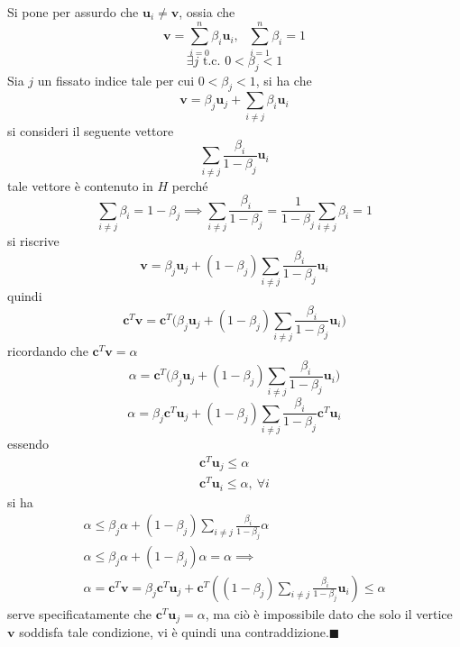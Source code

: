 \documentclass[10pt, letterpaper]{report}
\newcommand{\bc}{{\mathbf{c}}}
\begin{document}
\begin{figure}[h]
\end{figure}
Si pone per assurdo che $\mathbf u_i\ne\mathbf v$, ossia che 
$$ \mathbf v = \sum_{i=0}^n \beta_i\mathbf u_i, \ \ \ \sum_{i=1}^n\beta_i=1$$
$$ \exists j \text{ t.c. }0<\beta_j<1$$
Sia $j$ un fissato indice tale per cui $0<\beta_j<1$, si ha che 
$$ \mathbf v = \beta_j\mathbf u_j+\sum_{i\ne j}\beta_i\mathbf u_i$$
si consideri il seguente vettore 
$$ \sum_{i\ne j}\frac{\beta_i}{1-\beta_j}\mathbf u_i$$
tale vettore è contenuto in $H$ perché 
$$ \sum_{i\ne j}\beta_i=1-\beta_j\implies \sum_{i\ne j}\frac{\beta_i}{1-\beta_j}=\frac{1}{1-\beta_j}\sum_{i\ne j}\beta_i=1$$
si riscrive 
$$ \mathbf v = \beta_j\mathbf u_j+(1-\beta_j)\sum_{i\ne j}\frac{\beta_i}{1-\beta_j}\mathbf u_i$$
quindi 
$$ \bc^T\mathbf v=\bc^T\Big(
\beta_j\mathbf u_j+(1-\beta_j)\sum_{i\ne j}\frac{\beta_i}{1-\beta_j}\mathbf u_i    
\Big)$$
ricordando che $\bc^T\mathbf v = \alpha$
$$ \alpha=\bc^T\Big(
\beta_j\mathbf u_j+(1-\beta_j)\sum_{i\ne j}\frac{\beta_i}{1-\beta_j}\mathbf u_i    
\Big)$$
$$ \alpha=
\beta_j\bc^T\mathbf u_j+(1-\beta_j)\sum_{i\ne j}\frac{\beta_i}{1-\beta_j}\bc^T\mathbf u_i    
$$
essendo $$ \begin{matrix}
    \bc^T\mathbf u_j\le \alpha \\ 
    \bc^T\mathbf u_i \le \alpha, \ \forall i
\end{matrix}$$
si ha 
\begin{eqnarray*}
    \alpha \le \beta_j\alpha+(1-\beta_j)\sum_{i\ne j}\frac{\beta_i}{1-\beta_j}\alpha\\ 
    \alpha \le \beta_j\alpha+(1-\beta_j)\alpha=\alpha\implies\\ 
    \alpha = \bc^T\mathbf v = \beta_j\bc^T\mathbf u_j+\bc^T((1-\beta_j)\sum_{i\ne j}\frac{\beta_i}{1-\beta_j}\mathbf u_i)\le \alpha 
\end{eqnarray*}
serve specificatamente che $\bc^T\mathbf u_j=\alpha$, ma ciò è impossibile dato che solo il vertice $\mathbf v$ soddisfa tale condizione, vi è quindi una contraddizione.\hfill$\blacksquare$\bigskip 
\end{document}
